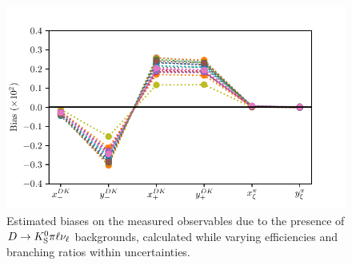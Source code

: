 
\begin{figure}[tb]
    \centering
    \includegraphics[width=0.65\columnwidth]{figures/analysis/background_checks/D2Kstmunu_biases.pdf}
    \caption{Estimated biases on the measured observables due to the presence of ${D}\rightarrow{\ensuremath{{K}^0_{\mathrm{S}}}}\pi\ell\nu_\ell$ backgrounds, calculated while varying efficiencies and branching ratios within uncertainties.}
    \label{fig:d2kstmunu_biases}
\end{figure}

